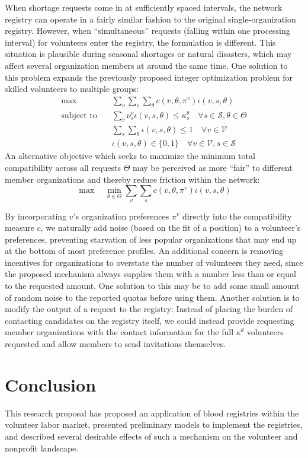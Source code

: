 \documentclass[11pt, margin=1in]{article}
\begin{document}
When shortage requests come in at sufficiently spaced intervals, the network registry can operate in a fairly similar fashion to the original single-organization registry. However, when ``simultaneous'' requests (falling within one processing interval) for volunteers enter the registry, the formulation is different. This situation is plausible during seasonal shortages or natural disasters, which may affect several organization members at around the same time. One solution to this problem expands the previously proposed integer optimization problem for skilled volunteers to multiple groups:
\begin{align*}
\max \quad 
& \sum_v \sum_s \sum_\theta c(v, \theta, \pi^v) \iota(v, s, \theta) \\
\text{subject to} \quad 
& \sum_v \nu_s^v \iota(v, s, \theta) \leq \kappa_s^\theta \quad \forall s \in \mathcal{S}, \theta \in \Theta \\
& \sum_s \sum_\theta \iota(v, s, \theta) \leq 1 \quad \forall v \in \mathcal{V} \\
& \iota(v, s, \theta) \in \{0, 1\} \quad \forall v \in \mathcal{V}, s \in \mathcal{S}
\end{align*}
An alternative objective which seeks to maximize the minimum total compatibility across all requests $\Theta$ may be perceived as more ``fair'' to different member organizations and thereby reduce friction within the network:
\[
\max \quad \min_{\theta \in \Theta} \sum_v \sum_s c(v, \theta, \pi^v) \iota(v, s, \theta)
\]

By incorporating $v$'s organization preferences $\pi^v$ directly into the compatibility measure $c$, we naturally add noise (based on the fit of a position) to a volunteer's preferences, preventing starvation of less popular organizations that may end up at the bottom of most preference profiles. An additional concern is removing incentives for organizations to overstate the number of volunteers they need, since the proposed mechanism always supplies them with a number less than or equal to the requested amount. One solution to this may be to add some small amount of random noise to the reported quotas before using them. Another solution is to modify the output of a request to the registry: Instead of placing the burden of contacting candidates on the registry itself, we could instead provide requesting member organizations with the contact information for the full $\kappa^\theta$ volunteers requested and allow members to send invitations themselves.

\section{Conclusion}
This research proposal has proposed an application of blood registries within the volunteer labor market, presented preliminary models to implement the registries, and described several desirable effects of such a mechanism on the volunteer and nonprofit landscape. 




\end{document}
